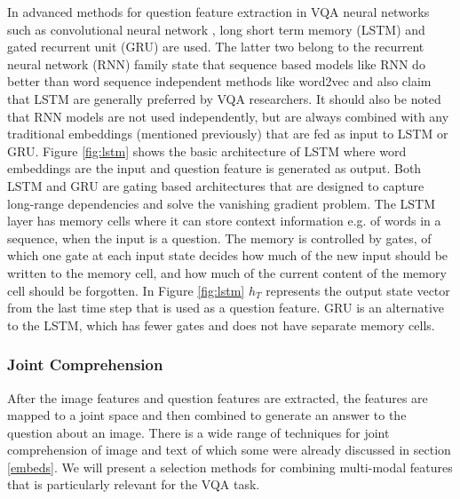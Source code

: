 \documentclass{article}
\begin{document}
In advanced methods for question feature extraction in VQA neural networks such as convolutional neural network \citep{krizhevsky2012imagenet}, long short term memory (LSTM) \citep{lstm} and gated recurrent unit (GRU) \citep{cho2014gru} are used. The latter two belong to the recurrent neural network (RNN) family \citep{elman1990finding} \cite{young2018recent} state that sequence based models like RNN do better than word sequence independent methods like word2vec and also claim that LSTM are generally preferred by VQA researchers. It should also be noted that RNN models are not used independently, but are always combined with any traditional embeddings (mentioned previously) that are fed as input to LSTM or GRU. Figure \ref{fig:lstm} shows the basic architecture of LSTM where word embeddings are the input and question feature is generated as output. Both LSTM and GRU are gating based architectures that are designed to capture long-range dependencies and solve the vanishing gradient problem. The LSTM layer has memory cells where it can store context information e.g. of words in a sequence, when the input is a question. The memory is controlled by gates, of which one gate at each input state decides how much of the new input should be written to the memory cell, and how much of the current content of the memory cell should be forgotten. In Figure \ref{fig:lstm} $h_T$ represents the output state vector from the last time step that is used as a question feature. GRU is an alternative to the LSTM, which has fewer gates and does not have separate memory cells.

\subsubsection{Joint Comprehension}

After the image features and question features are extracted, the features are mapped to a joint space and then combined to generate an answer to the question about an image. There is a wide range of techniques for joint comprehension of image and text of which some were already discussed in section \ref{embeds}. We will present a selection methods for combining multi-modal features that is particularly relevant for the VQA task.
\end{document}
